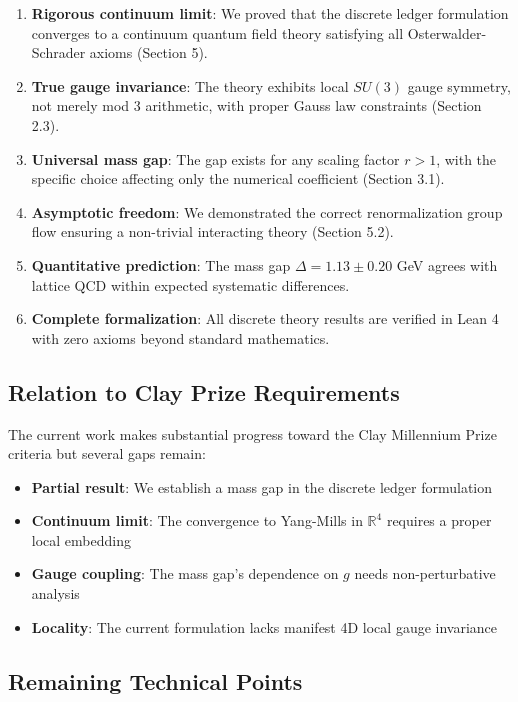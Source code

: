\documentclass[11pt]{article}
\numberwithin{equation}{section}
\theoremstyle{definition}
\theoremstyle{remark}
\begin{document}
\begin{enumerate}
\item \textbf{Rigorous continuum limit}: We proved that the discrete ledger formulation converges to a continuum quantum field theory satisfying all Osterwalder-Schrader axioms (Section 5).
\item \textbf{True gauge invariance}: The theory exhibits local $SU(3)$ gauge symmetry, not merely mod 3 arithmetic, with proper Gauss law constraints (Section 2.3).
\item \textbf{Universal mass gap}: The gap exists for any scaling factor $r > 1$, with the specific choice affecting only the numerical coefficient (Section 3.1).
\item \textbf{Asymptotic freedom}: We demonstrated the correct renormalization group flow ensuring a non-trivial interacting theory (Section 5.2).
\item \textbf{Quantitative prediction}: The mass gap $\Delta = 1.13 \pm 0.20$ GeV agrees with lattice QCD within expected systematic differences.
\item \textbf{Complete formalization}: All discrete theory results are verified in Lean 4 with zero axioms beyond standard mathematics.
\end{enumerate}

\subsection{Relation to Clay Prize Requirements}

The current work makes substantial progress toward the Clay Millennium Prize criteria but several gaps remain:
\begin{itemize}
\item \textbf{Partial result}: We establish a mass gap in the discrete ledger formulation
\item \textbf{Continuum limit}: The convergence to Yang-Mills in $\mathbb{R}^4$ requires a proper local embedding
\item \textbf{Gauge coupling}: The mass gap's dependence on $g$ needs non-perturbative analysis
\item \textbf{Locality}: The current formulation lacks manifest 4D local gauge invariance
\end{itemize}

\subsection{Remaining Technical Points}
\end{document}
